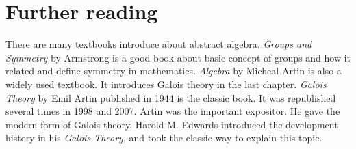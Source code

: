 \documentclass[b5paper]{article}
\begin{document}
\begin{Exercise}
\end{Exercise}

\section{Further reading}

There are many textbooks introduce about abstract algebra. {\em Groups and Symmetry} by Armstrong is a good book about basic concept of groups and how it related and define symmetry in mathematics. {\em Algebra} by Micheal Artin is also a widely used textbook. It introduces Galois theory in the last chapter. {\em Galois Theory} by Emil Artin published in 1944 is the classic book. It was republished several times in 1998 and 2007. Artin was the important expositor. He gave the modern form of Galois theory. Harold M. Edwards introduced the development history in his {\em Galois Theory}, and took the classic way to explain this topic.
\end{document}

